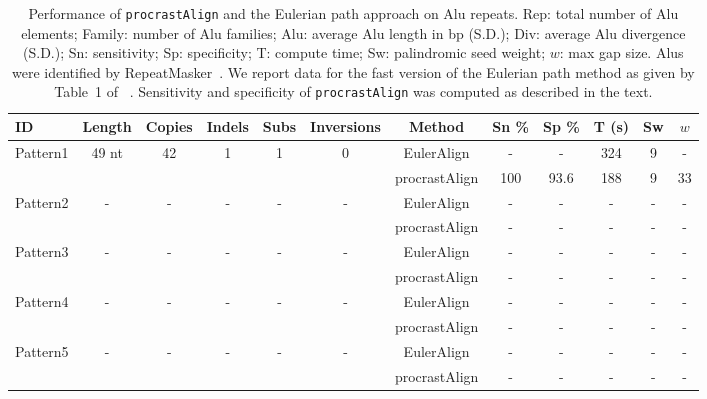 \documentclass[twoside,11pt]{article}
\begin{document}
\begin{table}[t]
\scriptsize
  \centering
\begin{tabular}{lccccccccccc}
\hline ID & Length & Copies & Indels & Subs & Inversions & Method & Sn \% & Sp \% & T (s) & Sw & $w$ \\
\hline
\hline Pattern1 &  49 nt &  42 & 1 & 1 & 0 & EulerAlign & - & - & 324 & 9 & - \\
\cline{7-12}                                            &&&&&& procrastAlign & 100 & 93.6 & 188 & 9 & 33 \\
\hline Pattern2 &   - &  - & - & - & - & EulerAlign & - & - & - & - & -  \\
\cline{7-12}                                            &&&&&& procrastAlign & - &- & - & - & -\\
\hline Pattern3 & - &  - & - & - & - & EulerAlign & - & -& - & - & - \\
\cline{7-12}                                            &&&&&& procrastAlign & -& - & -& - & - \\
\hline Pattern4 & - & - & - & - & - & EulerAlign & -& -& - & - & - \\
\cline{7-12}                                            &&&&&& procrastAlign & - &- & - & - &- \\
\hline Pattern5 & - & - & - & - & - & EulerAlign & -& -& - & - & - \\
\cline{7-12}                                            &&&&&& procrastAlign & - & - &- & - & - \\
\end{tabular}
\vspace{0.1cm}
  \caption{Performance of \texttt{procrastAlign} and the Eulerian path approach on Alu repeats.
  Rep: total number of Alu elements; Family: number of Alu
  families; Alu: average Alu length in bp (S.D.); Div: average Alu divergence (S.D.);
   Sn: sensitivity; Sp: specificity; T: compute time; Sw: palindromic seed weight; $w$: max gap size.  Alus were
  identified by RepeatMasker~\cite{ref-repbase}. We report data for the fast
  version of the Eulerian path method as given by Table~1 of ~\cite{ref-related1}. Sensitivity and specificity
  of \texttt{procrastAlign} was computed as described in the text.}
  \label{table:alu}
\end{table}
\end{document}
